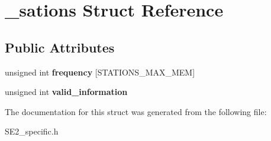 \hypertarget{struct__sations}{\section{\+\_\+sations Struct Reference}
\label{struct__sations}
}
\subsection*{Public Attributes}
\begin{DoxyCompactItemize}
\item 
\hypertarget{struct__sations_a63532d8db930b81dcab67b18fa2d1287}{unsigned int {\bfseries frequency} \mbox{[}S\+T\+A\+T\+I\+O\+N\+S\+\_\+\+M\+A\+X\+\_\+\+M\+E\+M\mbox{]}}\label{struct__sations_a63532d8db930b81dcab67b18fa2d1287}

\item 
\hypertarget{struct__sations_a2a0a49265bd245f691587a356f182d82}{unsigned int {\bfseries valid\+\_\+information}}\label{struct__sations_a2a0a49265bd245f691587a356f182d82}

\end{DoxyCompactItemize}


The documentation for this struct was generated from the following file\+:\begin{DoxyCompactItemize}
\item 
S\+E2\+\_\+specific.\+h\end{DoxyCompactItemize}
